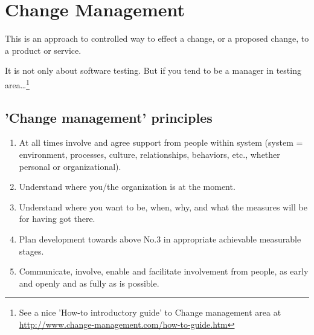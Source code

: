 \section{Change Management}
\label{sec:Change Management}

This is an approach to controlled way to effect a change, or a proposed change, to a product or service.

It is not only about software testing. But if you tend to be a manager in testing area\ldots\footnote{See a nice 'How-to introductory guide' to Change management area at \url{http://www.change-management.com/how-to-guide.htm}}

\subsection{'Change management' principles}
\label{sec:'Change management' principles}

        \begin{enumerate}
\item 
At all times involve and agree support from people within system (system = environment, processes, culture, relationships, behaviors, etc., whether personal or organizational).
\item 
        Understand where you/the organization is at the moment.
\item 
        Understand where you want to be, when, why, and what the measures will be for having got there.
\item 
        Plan development towards above No.3 in appropriate achievable measurable stages.
\item 
        Communicate, involve, enable and facilitate involvement from people, as early and openly and as fully as is possible.                                                                                                                             \end{enumerate}